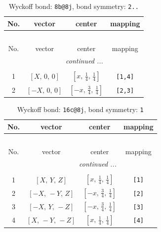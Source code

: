 \documentclass[fleqn,8pt]{jsarticle}
\begin{document}
\renewcommand{\arraystretch}{1.2}
\begin{longtable}{cccc}
\caption{Wyckoff bond: {\tt 8b@8j}, bond symmetry: {\tt 2..}}
 \\
 \hline \hline
No. & vector & center & mapping \\ \hline \endfirsthead

\multicolumn{3}{l}{\tablename\ \thetable{}} \\
 \hline \hline
No. & vector & center & mapping \\ \hline \endhead

 \hline \hline
\multicolumn{3}{r}{\footnotesize\it continued ...} \\ \endfoot

 \hline \hline
\multicolumn{3}{r}{} \\ \endlastfoot

1 & $\left[ X,\, 0,\, 0 \right]$ & $\left[ x,\, \frac{1}{4},\, \frac{1}{4} \right]$ & {\tt [1,4]} \\ \hline
2 & $\left[ - X,\, 0,\, 0 \right]$ & $\left[ - x,\, \frac{3}{4},\, \frac{1}{4} \right]$ & {\tt [2,3]} \\
\end{longtable}
\renewcommand{\arraystretch}{1.2}
\begin{longtable}{cccc}
\caption{Wyckoff bond: {\tt 16c@8j}, bond symmetry: {\tt 1}}
 \\
 \hline \hline
No. & vector & center & mapping \\ \hline \endfirsthead

\multicolumn{3}{l}{\tablename\ \thetable{}} \\
 \hline \hline
No. & vector & center & mapping \\ \hline \endhead

 \hline \hline
\multicolumn{3}{r}{\footnotesize\it continued ...} \\ \endfoot

 \hline \hline
\multicolumn{3}{r}{} \\ \endlastfoot

1 & $\left[ X,\, Y,\, Z \right]$ & $\left[ x,\, \frac{1}{4},\, \frac{1}{4} \right]$ & {\tt [1]} \\ \hline
2 & $\left[ - X,\, - Y,\, Z \right]$ & $\left[ - x,\, \frac{3}{4},\, \frac{1}{4} \right]$ & {\tt [2]} \\ \hline
3 & $\left[ - X,\, Y,\, - Z \right]$ & $\left[ - x,\, \frac{3}{4},\, \frac{1}{4} \right]$ & {\tt [3]} \\ \hline
4 & $\left[ X,\, - Y,\, - Z \right]$ & $\left[ x,\, \frac{1}{4},\, \frac{1}{4} \right]$ & {\tt [4]} \\
\end{longtable}
\end{document}
